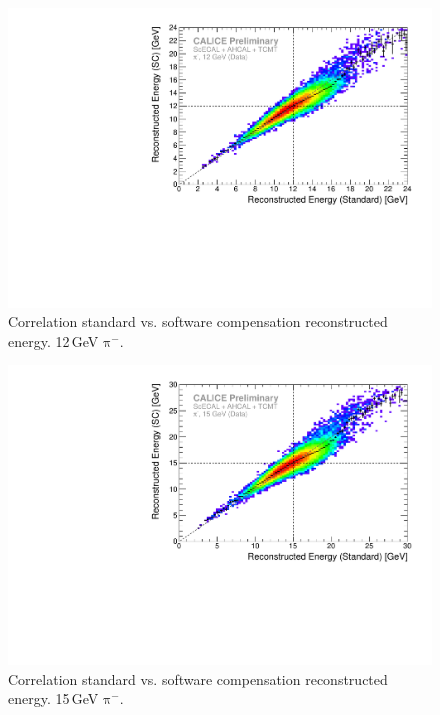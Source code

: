 \documentclass[twoside,a4paper,12pt]{article}
\newcommand\piminus{\(\mathrm{\pi^-}\)}
\begin{document}
\begin{figure}[htbp]
\begin{center}
\includegraphics[width=1\textwidth,page=1]{ERec_corr_560498_data}
\caption{Correlation standard vs. software compensation reconstructed energy. 12\,GeV \piminus.}
\label{fig:erec_12gev}
\end{center}
\end{figure}

\begin{figure}[htbp]
\begin{center}
\includegraphics[width=1\textwidth,page=1]{ERec_corr_560496_data}
\caption{Correlation standard vs. software compensation reconstructed energy. 15\,GeV \piminus.}
\label{fig:erec_15gev}
\end{center}
\end{figure}
\end{document}
